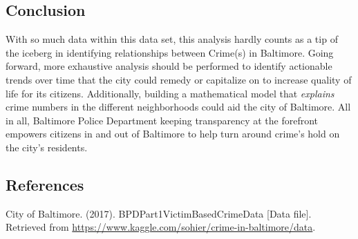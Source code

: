 \documentclass{article}
\newlength\tindent
\renewcommand{\indent}{\hspace*{\tindent}}
\begin{document}
 

\subsection*{Conclusion}
\indent With so much data within this data set, this analysis hardly counts as a tip of the iceberg in identifying relationships between Crime(s) in Baltimore.  Going forward, more exhaustive analysis should be performed to identify actionable trends over time that the city could remedy or capitalize on to increase quality of life for its citizens.  Additionally, building a mathematical model that \textit{explains} crime numbers in the different neighborhoods could aid the city of Baltimore.  All in all, Baltimore Police Department keeping transparency at the forefront empowers citizens in and out of Baltimore to help turn around crime's hold on the city's residents.  


\subsection*{References}
City of Baltimore. (2017). BPDPart1VictimBasedCrimeData [Data file].  Retrieved from \url{https://www.kaggle.com/sohier/crime-in-baltimore/data}.  


\end{document}
